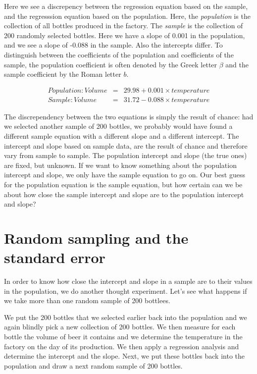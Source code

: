 \documentclass[]{report}\usepackage[]{graphicx}\usepackage[]{color}
\begin{document}
Here we see a discrepency between the regression equation based on the sample, and the regresssion equation based on the population. Here, the \textit{population} is the collection of all bottles produced in the factory. The \textit{sample} is the collection of 200 randomly selected bottles. Here we have a slope of 0.001 in the population, and we see a slope of -0.088 in the sample. Also the intercepts differ. To distinguish between the coefficients of the population and coefficients of the sample, the population coefficient is often denoted by the Greek letter $\beta$ and the sample coefficient by the Roman letter $b$.



\begin{eqnarray}
Population: Volume &=& 29.98 + 0.001 \times temperature  \nonumber\\
Sample: Volume &=&  31.72  -0.088 \times temperature \nonumber
\end{eqnarray}

The discrependency between the two equations is simply the result of chance: had we selected another sample of 200 bottles, we probably would have found a different sample equation with a different slope and a different intercept. The intercept and slope based on sample data, are the result of chance and therefore vary from sample to sample. The population intercept and slope (the true ones) are fixed, but unknown. If we want to know something about the population intercept and slope, we only have the sample equation to go on. Our best guess for the population equation is the sample equation, but how certain can we be about how close the sample intercept and slope are to the population intercept and slope?


\section{Random sampling and the standard error}


In order to know how close the intercept and slope in a sample are to their values in the population, we do another thought experiment. Let's see what happens if we take more than one random sample of 200 bottlees. 

We put the 200 bottles that we selected earlier back into the population and we again blindly pick a new collection of 200 bottles. We then measure for each bottle the volume of beer it contains and we determine the temperature in the factory on the day of its production. We then apply a regression analysis and determine the intercept and the slope. Next, we put these bottles back into the population and draw a next random sample of 200 bottles.
\end{document}
